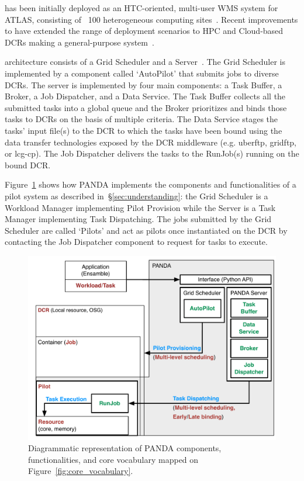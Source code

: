 \documentclass{sig-alternate}
\begin{document}
\panda has been initially deployed as an HTC-oriented, multi-user WMS system for
ATLAS, consisting of ~100 heterogeneous computing sites~\cite{maeno2012pd2p}.
Recent improvements to \panda have extended the range of deployment scenarios to
HPC and Cloud-based DCRs making \panda a general-purpose \pilot
system~\cite{nilsson2012recentrp}.

\panda architecture consists of a Grid Scheduler and a \panda
Server~\cite{panda_architecture_url,maeno2011overview}. The Grid Scheduler is
implemented by a component called `AutoPilot' that submits jobs to diverse DCRs.
The \panda server is implemented by four main components: a Task Buffer, a
Broker, a Job Dispatcher, and a Data Service. The Task Buffer collects all the
submitted tasks into a global queue and the Broker prioritizes and binds those
tasks to DCRs on the basis of multiple criteria. The Data Service stages the
tasks' input file(s) to the DCR to which the tasks have been bound using the
data transfer technologies exposed by the DCR middleware (e.g. uberftp, gridftp,
or lcg-cp). The Job Dispatcher delivers the tasks to the RunJob(s) running on
the bound DCR.

Figure~\ref{fig:panda_comparison} shows how PANDA implements the components and
functionalities of a pilot system as described in~\S\ref{sec:understanding}: the
Grid Scheduler is a Workload Manager implementing Pilot Provision while the
\panda Server is a Task Manager implementing Task Dispatching. The jobs
submitted by the Grid Scheduler are called `Pilots' and act as pilots once
instantiated on the DCR by contacting the Job Dispatcher component to request
for tasks to execute.

\begin{figure}[t]
    \centering
        \includegraphics[width=.48\textwidth]{figures/panda_comparison.pdf}
    \caption{Diagrammatic representation of PANDA components, functionalities,
    and core vocabulary mapped on Figure~\ref{fig:core_vocabulary}.}
    \label{fig:panda_comparison}
\end{figure}
\end{document}
